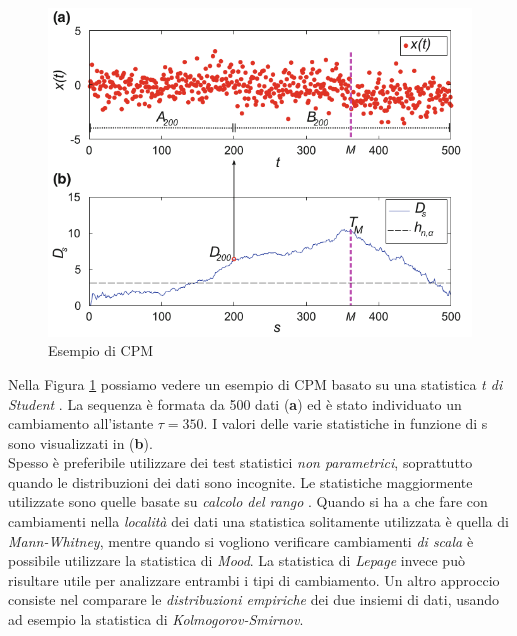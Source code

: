 \begin{figure}
	\centering
	\includegraphics[width=12cm,keepaspectratio]{pictures/CPM}
	\caption{Esempio di CPM}
	\label{fig:CPM}
\end{figure}
Nella Figura \ref{fig:CPM} possiamo vedere un esempio di CPM basato su una statistica \textit{t di Student} \cite{alippi2014intelligence}. La sequenza \`e formata da 500 dati (\textbf{a}) ed \`e stato individuato un cambiamento all'istante $\tau=350$. I valori delle varie statistiche in funzione di s sono visualizzati in (\textbf{b}).\\
Spesso \`e preferibile utilizzare dei test
statistici \textit{non parametrici},
soprattutto quando le distribuzioni dei dati
sono incognite. Le statistiche maggiormente
utilizzate sono quelle basate su
\textit{calcolo del rango}
\cite{ross2011nonparametric}. Quando si ha a
che fare con cambiamenti nella
\textit{localit\`a} dei dati una statistica
solitamente utilizzata \`e quella di
\textit{Mann-Whitney}, mentre quando si
vogliono verificare cambiamenti \textit{di
	scala} \`e possibile utilizzare la
statistica di \textit{Mood}. La statistica di
\textit{Lepage} invece pu\`o risultare utile
per analizzare entrambi i tipi di
cambiamento. Un altro approccio consiste nel
comparare le \textit{distribuzioni empiriche}
dei due insiemi di dati, usando ad esempio la
statistica di \textit{Kolmogorov-Smirnov}.
